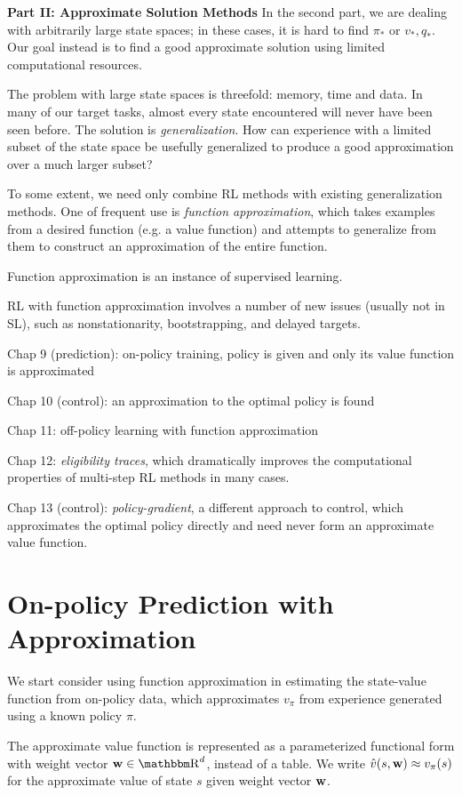 \documentclass[sutton_barto_notes.tex]{subfiles}
\begin{document}
\newpage
\textbf{Part II: Approximate Solution Methods}
In the second part, we are dealing with arbitrarily large state spaces; in these cases, it is hard to find $\pi_*$ or $v_*, q_*$.
Our goal instead is to find a good approximate solution using limited computational resources.

The problem with large state spaces is threefold: memory, time and data.
In many of our target tasks, almost every state encountered will never have been seen before. The solution is \textit{generalization}.
How can experience with a limited subset of the state space be usefully generalized to produce a good approximation over a much larger subset?

To some extent, we need only combine RL methods with existing  generalization methods. One of frequent use is \textit{function approximation}, which takes examples from a desired function (e.g. a value function) and attempts to generalize from them to construct an approximation of the entire function.

Function approximation is an instance of supervised learning.

RL with function approximation involves a number of new issues (usually not in SL), such as nonstationarity, bootstrapping, and delayed targets.

Chap 9 (prediction): on-policy training, policy is given and only its value function is approximated

Chap 10 (control): an approximation to the optimal policy is found

Chap 11: off-policy learning with function approximation

Chap 12: \textit{eligibility traces}, which dramatically improves the computational properties of multi-step RL methods in many cases.

Chap 13 (control): \textit{policy-gradient}, a different approach to control, which approximates the optimal policy directly and need never form an approximate value function.

\newpage
\section{On-policy Prediction with Approximation}

We start consider using function approximation in estimating the state-value function from on-policy data, which approximates $v_\pi$ from experience generated using a known policy $\pi$.

The approximate value function is represented as a parameterized functional form with weight vector ${\bw} \in \R^d$, instead of a table.
We write $\hat{v}(s,{\operatorname*{\mathbf{w}}}) \approx v_\pi(s)$ for the approximate value of state $s$ given weight vector ${\operatorname*{\mathbf{w}}}$.
\end{document}

